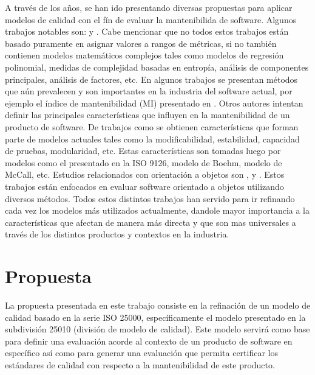 \documentclass[letterpaper]{article}
\begin{document}
A través de los años, se han ido presentando diversas propuestas para aplicar modelos
de calidad con el fín de evaluar la mantenibilida de software. Algunos trabajos
notables son: \cite{Coleman:1994} y \cite{Oman:1992}. Cabe mencionar que no todos estos trabajos
están basado puramente en asignar valores a rangos de métricas, si no también
contienen modelos matemáticos complejos tales como modelos de regresión polinomial,
medidas de complejidad basadas en entropía, análisis de componentes principales, 
análisis de factores, etc.
En algunos trabajos se presentan métodos que aún prevalecen y son importantes en
la industria del software actual, por ejemplo el índice de mantenibilidad (MI) 
presentado en \cite{West:1996}.
Otros autores intentan definir las principales características que influyen en la
mantenibilidad de un producto de software. De trabajos como \cite{survey} se obtienen
características que forman parte de modelos actuales tales como la modificabilidad,
estabilidad, capacidad de pruebas, modularidad, etc. Estas características son 
tomadas luego por modelos como el presentado en la ISO 9126, modelo de Boehm, 
modelo de McCall, etc.
Estudios relacionados con orientación a objetos son \cite{roadmap}, \cite{pastDecade} y \cite{TowardsACatalog}. Estos trabajos
están enfocados en evaluar software orientado a objetos utilizando diversos
métodos.
Todos estos distintos trabajos han servido para ir refinando cada vez los modelos
más utilizados actualmente, dandole mayor importancia a la características que 
afectan de manera más directa y que son mas universales a través de los distintos
productos y contextos en la industria.

\section{Propuesta}

La propuesta presentada en este trabajo consiste en la refinación de un modelo
de calidad basado en la serie ISO 25000, específicamente el modelo presentado
en la subdivisión 25010 (división de modelo de calidad). 
Este modelo servirá como base para definir una evaluación acorde al contexto
de un producto de software en específico así como para generar una evaluación
que permita certificar los estándares de calidad con respecto a la mantenibilidad
de este producto.
\end{document}
